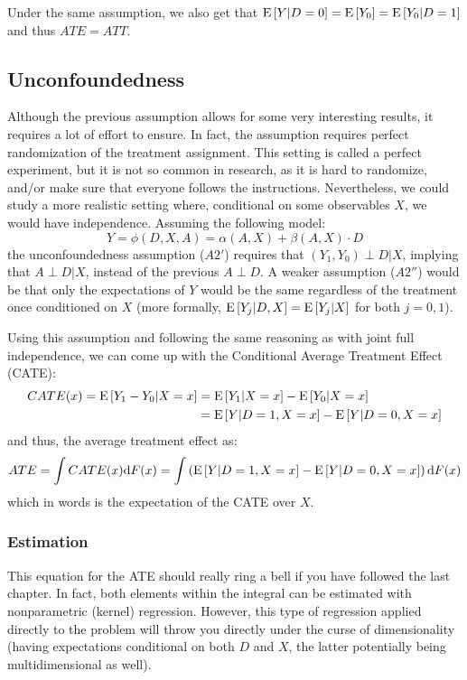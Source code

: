 Under the same assumption, we also get that $\operatorname{E}\left[Y\vert D =0\right] = \operatorname{E}\left[Y_0\right] = \operatorname{E}\left[Y_0\vert D =1\right]$ and thus $ ATE = ATT$.

\subsection{Unconfoundedness}

Although the previous assumption allows for some very interesting results, it requires a lot of effort to ensure. In fact, the assumption requires perfect randomization of the treatment assignment. This setting is called a perfect experiment, but it is not so common in research, as it is hard to randomize, and/or make sure that everyone follows the instructions. Nevertheless, we could study a more realistic setting where, conditional on some observables $X$, we would have independence. Assuming the following model:
$$ Y = \phi(D, X, A) = \alpha(A, X) + \beta(A, X)\cdot D $$ the unconfoundedness assumption ($A2'$) requires that $(Y_1, Y_0) \perp D\vert X $, implying that $A\perp D\vert X$, instead of the previous $A\perp D$. A weaker assumption ($A2''$) would be that only the expectations of $Y$ would be the same regardless of the treatment once conditioned on $X$ (more formally, $\operatorname{E}\left[Y_j\vert D, X\right] = \operatorname{E}\left[Y_j\vert X\right]$ for both $j = 0,1$).

Using this assumption and following the same reasoning as with joint full independence, we can come up with the Conditional Average Treatment Effect (CATE): \begin{align*} CATE(x) = \operatorname{E}\left[Y_1 - Y_0\vert X=x\right] & = \operatorname{E}\left[Y_1 \vert X=x\right] - \operatorname{E}\left[Y_0\vert X=x\right] \\ & = \operatorname{E}\left[Y \vert D=1, X=x\right] - \operatorname{E}\left[Y\vert D=0, X=x\right]
\end{align*}
and thus, the average treatment effect as: $$ATE = \int CATE(x) \mathrm{d} F(x) = \int \left(\operatorname{E}\left[Y \vert D=1, X=x\right] - \operatorname{E}\left[Y\vert D=0, X=x\right]\right)\mathrm{d} F(x) $$ which in words is the expectation of the CATE over $X$.

\subsubsection{Estimation}

This equation for the ATE should really ring a bell if you have followed the last chapter. In fact, both elements within the integral can be estimated with nonparametric (kernel) regression. However, this type of regression applied directly to the problem will throw you directly under the curse of dimensionality (having expectations conditional on both $D$ and $X$, the latter potentially being multidimensional as well).

